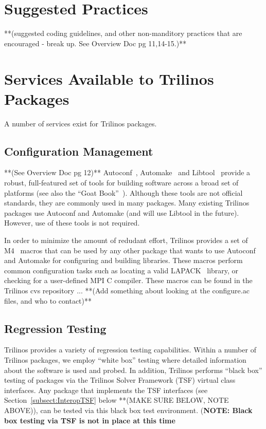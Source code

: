 \documentclass[12pt,relax]{TrilinosDevGuide}
\begin{document}
	\chapter{Suggested Practices}
	**(suggested coding guidelines, and other non-manditory practices that are encouraged - break up.  See Overview Doc pg 11,14-15.)**
	


	\chapter{Services Available to Trilinos Packages}
	A number of services exist for Trilinos packages.
	\section{Configuration Management}
	**(See Overview Doc pg 12)**
Autoconf~\cite{Autoconf},  Automake~\cite{Automake} and
Libtool~\cite{Libtool} provide a robust, full-featured set of tools for
building software across a broad set of platforms (see also the ``Goat
Book''~\cite{GoatBook}).  Although these
tools are not official standards, they are commonly used in many
packages.  Many existing
Trilinos packages use Autoconf and Automake (and will use
Libtool in the future).  However, use of these tools is not required.

In order to minimize the amount of redudant effort, Trilinos provides a set of
M4~\cite{M4} macros that can be used by any other
package that wants to use Autoconf and Automake for configuring and
building libraries.  These macros perform common configuration tasks such as
locating a valid LAPACK~\cite{lapack} library, or checking for a user-defined 
MPI C compiler.  These macros can be found in the Trilinos cvs repository ...
**(Add something about looking at the configure.ac files, and who to contact)**

	\section{Regression Testing}
Trilinos provides a variety of regression
testing capabilities.  Within a number of Trilinos packages, we employ
``white box'' testing where detailed information about the software is
used and probed.  In addition, Trilinos performs ``black box'' testing
of packages via the Trilinos Solver Framework (TSF) virtual class
interfaces.  Any package that implements the TSF interfaces (see
Section~\ref{subsect:InteropTSF} below **(MAKE SURE BELOW, NOTE ABOVE)), can be tested via this black box
test environment.  ({\bf NOTE: Black box testing via TSF is not in
place at this time}
\end{document}

